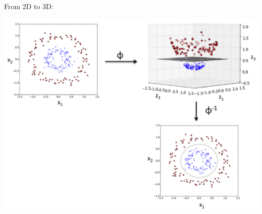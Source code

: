 \vspace{5mm}

From 2D to 3D:

\begin{center}
\includegraphics[scale=0.5]{kernel_3D.png}
\end{center}

\vspace{5mm}